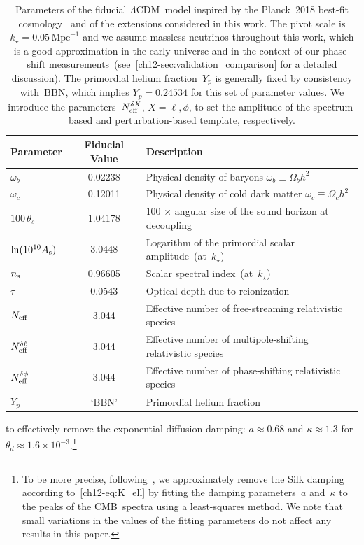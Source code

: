 \begin{table}
	\centering\small

	\begin{tabular}{l c l}
			\toprule
		Parameter 				& {Fiducial Value}		& Description															\\
			\midrule[0.065em]
		$\omega_b$ 				& 0.02238 				& Physical density of baryons $\omega_b \equiv \Omega_b h^2$			\\
		$\omega_c$				& 0.12011				& Physical density of cold dark matter $\omega_c \equiv \Omega_c h^2$	\\
		$100\,\theta_s$ 		& 1.04178 				& $100\,\times\,$angular size of the sound horizon at decoupling 		\\
		$\ln(10^{10}A_\mathrm{s})$		& 3.0448				& Logarithm of the primordial scalar amplitude~(at~$k_\star$)			\\
		$n_\mathrm{s}$					& 0.96605 				& Scalar spectral index~(at~$k_\star$)									\\
		$\tau$ 					& 0.0543 				& Optical depth due to reionization										\\
			\midrule[0.065em]
		$N_\mathrm{eff}$					& 3.044 				& Effective number of free-streaming relativistic species				\\
		$N_\mathrm{eff}^{\delta\ell}$			& 3.044 				& Effective number of multipole-shifting relativistic species\\
		$N_\mathrm{eff}^{\delta\phi}$				& 3.044 				& Effective number of phase-shifting relativistic species	\\
		$Y_p$					& {`BBN'\hskip6.5pt}	& Primordial helium fraction 											\\
			\bottomrule
	\end{tabular}
	\caption[Fiducial cosmological parameters]{Parameters of the fiducial $\Lambda$CDM~model inspired by the Planck~2018 best-fit cosmology~\cite{Planck:2018vyg} and of the extensions considered in this work. The pivot scale is $k_\star = 0.05\,\mathrm{Mpc}^{-1}$ and we assume massless neutrinos throughout this work, which is a good approximation in the early universe and in the context of our phase-shift measurements~(see~\textsection\ref{ch12-sec:validation_comparison} for a detailed discussion). The primordial helium fraction~$Y_p$ is generally fixed by consistency with~BBN, which implies $Y_p = 0.24534$ for this set of parameter values. We introduce the parameters~$N_\mathrm{eff}^{\delta X}$, $X = \ell, \phi$, to set the amplitude of the spectrum-based and perturbation-based template, respectively.}
	\label{ch12-tab:parameters}
\end{table}
to effectively remove the exponential diffusion damping: $a \approx 0.68$ and $\kappa \approx 1.3$ for $\theta_d \approx 1.6 \times 10^{-3}$.\footnote{To be more precise, following~\cite{Wallisch:2018rzj}, we approximately remove the Silk damping according to~\eqref{ch12-eq:K_ell} by fitting the damping parameters~$a$ and~$\kappa$ to the peaks of the CMB~spectra using a least-squares method. We note that small variations in the values of the fitting parameters do not affect any results in this paper.}\medskip

